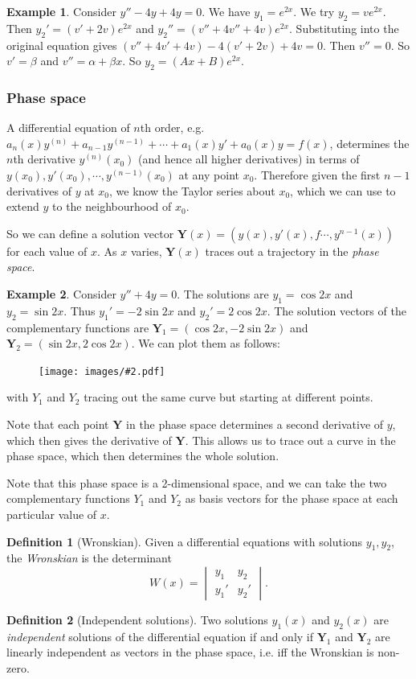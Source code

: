 \documentclass[a4paper]{article}
\theoremstyle{definition}
\newtheorem*{defi}{Definition}
\newtheorem*{eg}{Example}
\newcommand{\mb}[1]{\mathbf{#1}}
\newcommand{\img}[2][]{\begin{figure}[ht]\centering\texttt{[image: images/\#2.pdf]}\end{figure}}
\begin{document}
\begin{eg}
  Consider $y'' - 4y + 4y = 0$. We have $y_1 = e^{2x}$. We try $y_2 = ve^{2x}$. Then $y_2' = (v' + 2v)e^{2x}$ and $y_2'' = (v'' + 4v'' + 4v)e^{2x}$. Substituting into the original equation gives $(v'' + 4v' + 4v) - 4(v' + 2v) + 4v = 0$. Then $v'' = 0$. So $v' = \beta$ and $v'' = \alpha + \beta x$. So $y_2 = (Ax + B)e^{2x}$.
\end{eg}

\subsubsection{Phase space}
A differential equation of $n$th order, e.g. $a_n(x) y^{(n)} + a_{n - 1}y^{(n - 1)} + \cdots + a_1(x) y' + a_0 (x) y = f(x)$, determines the $n$th derivative $y^{(n)} (x_0)$ (and hence all higher derivatives) in terms of $y(x_0), y'(x_0), \cdots ,y^{(n - 1)}(x_0)$ at any point $x_0$. Therefore given the first $n - 1$ derivatives of $y$ at $x_0$, we know the Taylor series about $x_0$, which we can use to extend $y$ to the neighbourhood of $x_0$.

So we can define a solution vector $\mb{Y}(x) = (y(x), y'(x),f \cdots , y^{n - 1}(x))$ for each value of $x$. As $x$ varies, $\mb{Y}(x)$ traces out a trajectory in the \emph{phase space}.

\begin{eg}
  Consider $y'' + 4y = 0$. The solutions are $y_1 = \cos 2x$ and $y_2 = \sin 2x$. Thus $y_1' = -2\sin 2x$ and $y_2' = 2\cos 2x$. The solution vectors of the complementary functions are $\mb{Y}_1 = (\cos 2x, -2\sin 2x)$ and $\mb{Y}_2 = (\sin 2x, 2\cos 2x)$. We can plot them as follows:

\img{de_15}

with $Y_1$ and $Y_2$ tracing out the same curve but starting at different points.
\end{eg}

Note that each point $\mb{Y}$ in the phase space determines a second derivative of $y$, which then gives the derivative of $\mb{Y}$. This allows us to trace out a curve in the phase space, which then determines the whole solution.

Note that this phase space is a 2-dimensional space, and we can take the two complementary functions $Y_1$ and $Y_2$ as basis vectors for the phase space at each particular value of $x$.

\begin{defi}[Wronskian]
  Given a differential equations with solutions $y_1, y_2$, the \emph{Wronskian} is the determinant
\[
W(x) = \begin{vmatrix}y_1 & y_2 \\ y_1' & y_2'\end{vmatrix}.
\]
\end{defi}
\begin{defi}[Independent solutions]
  Two solutions $y_1(x)$ and $y_2(x)$ are \emph{independent} solutions of the differential equation if and only if $\mb{Y}_1$  and $\mb{Y}_2$  are linearly independent as vectors in the phase space, i.e. iff the Wronskian is non-zero.
\end{defi}
\end{document}
